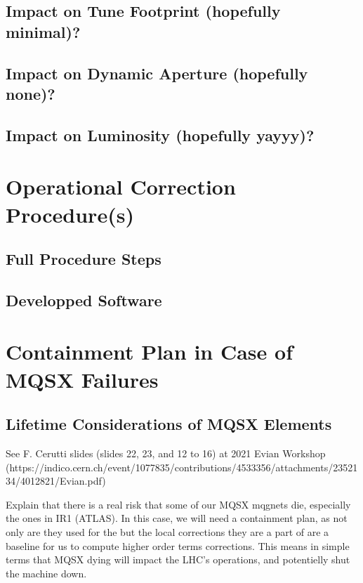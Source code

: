 \subsection{Impact on Tune Footprint (hopefully minimal)?}

\subsection{Impact on Dynamic Aperture (hopefully none)?}

\subsection{Impact on Luminosity (hopefully yayyy)?}


\section{Operational Correction Procedure(s)}

\subsection{Full Procedure Steps}

\subsection{Developped Software}


\section{Containment Plan in Case of MQSX Failures}

\subsection{Lifetime Considerations of MQSX Elements}

See F. Cerutti slides (slides 22, 23, and 12 to 16) at 2021 Evian Workshop
(https://indico.cern.ch/event/1077835/contributions/4533356/attachments/2352134/4012821/Evian.pdf)

Explain that there is a real risk that some of our MQSX mqgnets die, especially the ones in IR1 (ATLAS).
In this case, we will need a containment plan, as not only are they used for the but the local corrections they are a part of are a baseline for us to compute higher order terms corrections.
This means in simple terms that MQSX dying will impact the LHC's operations, and potentielly shut the machine down.

